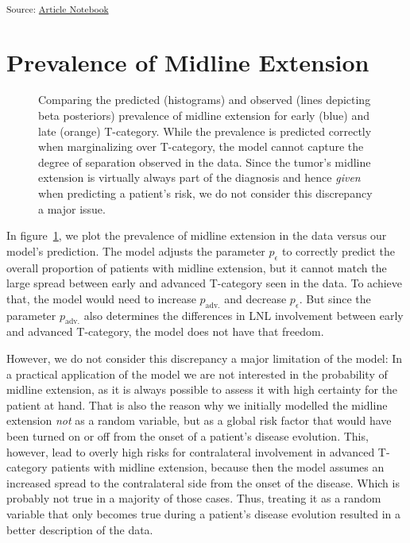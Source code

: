\documentclass[
  sn-mathphys-num,
]{sn-jnl}
\begin{document}
\textsubscript{Source:
\href{https://rmnldwg.github.io/bilateral-paper/manuscript.qmd.html}{Article
Notebook}}

\section{Prevalence of Midline Extension}\label{sec-prevalence-midext}

\begin{figure}


\caption{\label{fig-model-prevalences-midext}Comparing the predicted
(histograms) and observed (lines depicting beta posteriors) prevalence
of midline extension for early (blue) and late (orange) T-category.
While the prevalence is predicted correctly when marginalizing over
T-category, the model cannot capture the degree of separation observed
in the data. Since the tumor's midline extension is virtually always
part of the diagnosis and hence \emph{given} when predicting a patient's
risk, we do not consider this discrepancy a major issue.}

\end{figure}%

In figure~\ref{fig-model-prevalences-midext}, we plot the prevalence of
midline extension in the data versus our model's prediction. The model
adjusts the parameter \(p_\epsilon\) to correctly predict the overall
proportion of patients with midline extension, but it cannot match the
large spread between early and advanced T-category seen in the data. To
achieve that, the model would need to increase \(p_\text{adv.}\) and
decrease \(p_\epsilon\). But since the parameter \(p_\text{adv.}\) also
determines the differences in LNL involvement between early and advanced
T-category, the model does not have that freedom.

However, we do not consider this discrepancy a major limitation of the
model: In a practical application of the model we are not interested in
the probability of midline extension, as it is always possible to assess
it with high certainty for the patient at hand. That is also the reason
why we initially modelled the midline extension \emph{not} as a random
variable, but as a global risk factor that would have been turned on or
off from the onset of a patient's disease evolution. This, however, lead
to overly high risks for contralateral involvement in advanced
T-category patients with midline extension, because then the model
assumes an increased spread to the contralateral side from the onset of
the disease. Which is probably not true in a majority of those cases.
Thus, treating it as a random variable that only becomes true during a
patient's disease evolution resulted in a better description of the
data.
\end{document}
